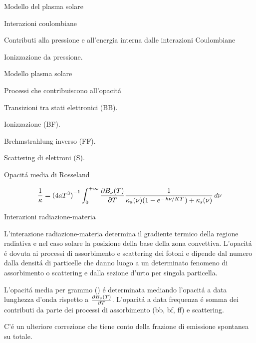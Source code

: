 \documentclass[10pt,xcolor={usenames},fleqn,mathserif,serif]{beamer}
\begin{document}
\begin{frame}{Modello del plasma solare}

\begin{block}{Interazioni coulombiane}

\end{block}

\begin{block}{Contributi alla pressione e all'energia interna dalle interazioni Coulombiane}

\end{block}

\begin{block}{Ionizzazione da pressione.}

\end{block}

\end{frame}

\begin{frame}{Modello plasma solare}

\begin{block}{Processi che contribuiscono all'opacit\'a}

Transizioni tra stati elettronici (BB).

Ionizzazione (BF).

Brehmstrahlung inverso (FF).

Scattering di elettroni (S).

\end{block}

\vfill

\begin{block}{Opacit\'a media di Rosseland}

\vfill

\begin{equation*}
\frac{1}{\kappa}=\invers{(4aT^3)}\int_0^{+\infty}\PDy{T}{B_{\nu}(T)}\frac{1}{\kappa_{a}(\nu)(1-\exp{-\midfrac{h\nu}{KT}})+\kappa_s(\nu)}\,d\nu
\end{equation*}

\end{block}

\vfill

\end{frame}

\begin{wordonframe}{Interazioni radiazione-materia}

L'interazione radiazione-materia determina il gradiente termico della regione radiativa e nel caso solare la posizione della base della zona convettiva. L'opacit\'a \'e dovuta ai processi di assorbimento e scattering dei fotoni e dipende dal numero dalla densit\'a di particelle che danno luogo a un determinato fenomeno di assorbimento o scattering e dalla sezione d'urto per singola particella.

L'opacit\'a media per grammo () \'e determinata mediando l'opacit\'a a data lunghezza d'onda rispetto a $\PDy{T}{B_{\nu}(T)}$. L'opacit\'a a data frequenza \'e somma dei contributi da parte dei processi di assorbimento (bb, bf, ff) e scattering.

C'\'e un ulteriore correzione che tiene conto della frazione di emissione spontanea su totale.

\end{wordonframe}
\end{document}
